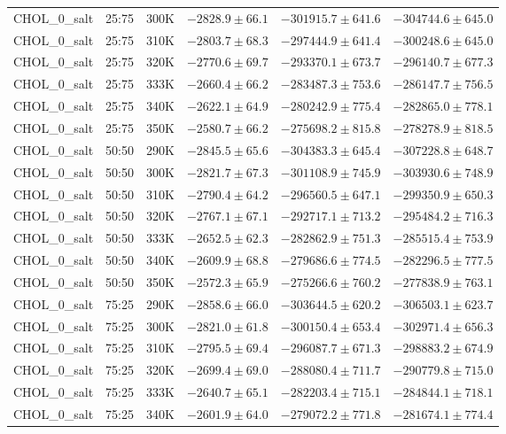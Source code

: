 \begin{longtable}{|c|c|c|c|c|c|}
CHOL\_0\_salt & 25:75 & 300K & $-2828.9 \pm 66.1$ & $-301915.7 \pm 641.6$ & $-304744.6 \pm 645.0$ \\
CHOL\_0\_salt & 25:75 & 310K & $-2803.7 \pm 68.3$ & $-297444.9 \pm 641.4$ & $-300248.6 \pm 645.0$ \\
CHOL\_0\_salt & 25:75 & 320K & $-2770.6 \pm 69.7$ & $-293370.1 \pm 673.7$ & $-296140.7 \pm 677.3$ \\
CHOL\_0\_salt & 25:75 & 333K & $-2660.4 \pm 66.2$ & $-283487.3 \pm 753.6$ & $-286147.7 \pm 756.5$ \\
CHOL\_0\_salt & 25:75 & 340K & $-2622.1 \pm 64.9$ & $-280242.9 \pm 775.4$ & $-282865.0 \pm 778.1$ \\
CHOL\_0\_salt & 25:75 & 350K & $-2580.7 \pm 66.2$ & $-275698.2 \pm 815.8$ & $-278278.9 \pm 818.5$ \\
CHOL\_0\_salt & 50:50 & 290K & $-2845.5 \pm 65.6$ & $-304383.3 \pm 645.4$ & $-307228.8 \pm 648.7$ \\
CHOL\_0\_salt & 50:50 & 300K & $-2821.7 \pm 67.3$ & $-301108.9 \pm 745.9$ & $-303930.6 \pm 748.9$ \\
CHOL\_0\_salt & 50:50 & 310K & $-2790.4 \pm 64.2$ & $-296560.5 \pm 647.1$ & $-299350.9 \pm 650.3$ \\
CHOL\_0\_salt & 50:50 & 320K & $-2767.1 \pm 67.1$ & $-292717.1 \pm 713.2$ & $-295484.2 \pm 716.3$ \\
CHOL\_0\_salt & 50:50 & 333K & $-2652.5 \pm 62.3$ & $-282862.9 \pm 751.3$ & $-285515.4 \pm 753.9$ \\
CHOL\_0\_salt & 50:50 & 340K & $-2609.9 \pm 68.8$ & $-279686.6 \pm 774.5$ & $-282296.5 \pm 777.5$ \\
CHOL\_0\_salt & 50:50 & 350K & $-2572.3 \pm 65.9$ & $-275266.6 \pm 760.2$ & $-277838.9 \pm 763.1$ \\
CHOL\_0\_salt & 75:25 & 290K & $-2858.6 \pm 66.0$ & $-303644.5 \pm 620.2$ & $-306503.1 \pm 623.7$ \\
CHOL\_0\_salt & 75:25 & 300K & $-2821.0 \pm 61.8$ & $-300150.4 \pm 653.4$ & $-302971.4 \pm 656.3$ \\
CHOL\_0\_salt & 75:25 & 310K & $-2795.5 \pm 69.4$ & $-296087.7 \pm 671.3$ & $-298883.2 \pm 674.9$ \\
CHOL\_0\_salt & 75:25 & 320K & $-2699.4 \pm 69.0$ & $-288080.4 \pm 711.7$ & $-290779.8 \pm 715.0$ \\
CHOL\_0\_salt & 75:25 & 333K & $-2640.7 \pm 65.1$ & $-282203.4 \pm 715.1$ & $-284844.1 \pm 718.1$ \\
CHOL\_0\_salt & 75:25 & 340K & $-2601.9 \pm 64.0$ & $-279072.2 \pm 771.8$ & $-281674.1 \pm 774.4$ \\

\end{longtable}
